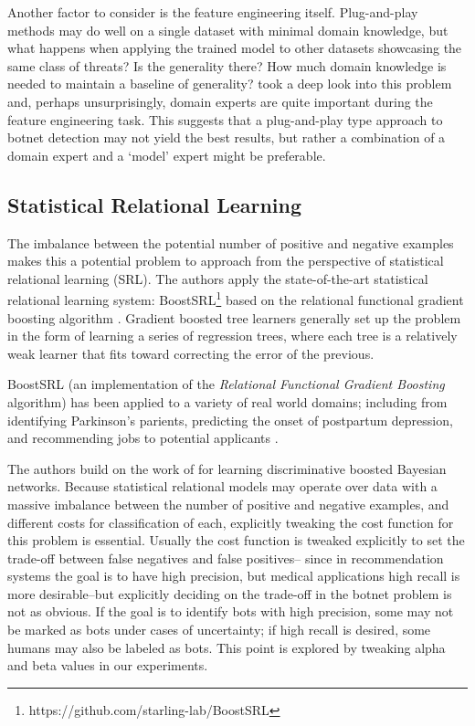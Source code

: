 \documentclass[letterpaper]{article}
\begin{document}
Another factor to consider is the feature engineering itself.  Plug-and-play methods may do well on a single dataset with minimal domain knowledge, but what happens when applying the trained model to other datasets showcasing the same class of threats?  Is the generality there?  How much domain knowledge is needed to maintain a baseline of generality?  \cite{BENASHER201551} took a deep look into this problem and, perhaps unsurprisingly, domain experts are quite important during the feature engineering task.  This suggests that a plug-and-play type approach to botnet detection may not yield the best results, but rather a combination of a domain expert and a `model' expert might be preferable.

\subsection{Statistical Relational Learning}

The imbalance between the potential number of positive and negative examples makes this a potential problem to approach from the perspective of statistical relational learning (SRL).  The authors apply the state-of-the-art statistical relational learning system: BoostSRL\footnote{https://github.com/starling-lab/BoostSRL} based on the relational functional gradient boosting algorithm \cite{natarajan2015boosted}.  Gradient boosted tree learners generally set up the problem in the form of learning a series of regression trees, where each tree is a relatively weak learner that fits toward correcting the error of the previous.

BoostSRL (an implementation of the \textit{Relational Functional Gradient Boosting} algorithm) has been applied to a variety of real world domains; including from identifying Parkinson's parients, predicting the onset of postpartum depression, and recommending jobs to potential applicants \cite{dhami2017identifying,natarajan2017boosting,yang2017combining}.

The authors build on the work of \cite{ramanan2017discriminative,yang2014learning} for learning discriminative boosted Bayesian networks.  Because statistical relational models may operate over data with a massive imbalance between the number of positive and negative examples, and different costs for classification of each, explicitly tweaking the cost function for this problem is essential.  Usually the cost function is tweaked explicitly to set the trade-off between false negatives and false positives-- since in recommendation systems the goal is to have high precision, but medical applications high recall is more desirable--but explicitly deciding on the trade-off in the botnet problem is not as obvious.  If the goal is to identify bots with high precision, some may not be marked as bots under cases of uncertainty; if high recall is desired, some humans may also be labeled as bots. This point is explored by tweaking alpha and beta values in our experiments.
\end{document}
